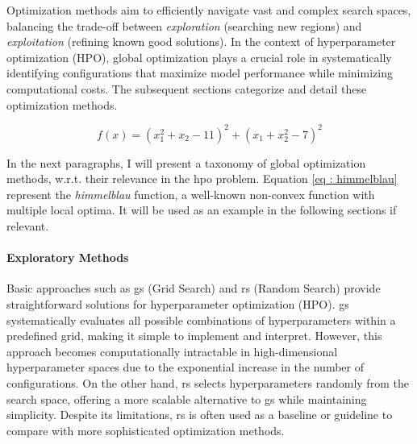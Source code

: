 Optimization methods aim to efficiently navigate vast and complex search spaces, balancing the trade-off between \textit{exploration} (searching new regions) and \textit{exploitation} (refining known good solutions). In the context of hyperparameter optimization (HPO), global optimization plays a crucial role in systematically identifying configurations that maximize model performance while minimizing computational costs. The subsequent sections categorize and detail these optimization methods. 

\begin{equation}
    f(x) = (x_1^2 + x_2 - 11)^2 + (x_1 + x_2^2 - 7)^2
    \label{eq : himmelblau}
\end{equation}

In the next paragraphs, I will present a taxonomy of global optimization methods, w.r.t. their relevance in the \acrshort{hpo} problem. Equation \ref{eq : himmelblau} represent the \textit{himmelblau} function, a well-known non-convex function with multiple local optima. It will be used as an example in the following sections if relevant. 




\paragraph{Exploratory Methods} 
Basic approaches such as \acrfull{gs} (Grid Search) and \acrfull{rs} (Random Search) provide straightforward solutions for hyperparameter optimization (HPO). \acrshort{gs} systematically evaluates all possible combinations of hyperparameters within a predefined grid, making it simple to implement and interpret. However, this approach becomes computationally intractable in high-dimensional hyperparameter spaces due to the exponential increase in the number of configurations. On the other hand, \acrshort{rs} selects hyperparameters randomly from the search space, offering a more scalable alternative to \acrshort{gs} while maintaining simplicity. Despite its limitations, \acrshort{rs} is often used as a baseline or guideline to compare with more sophisticated optimization methods.


